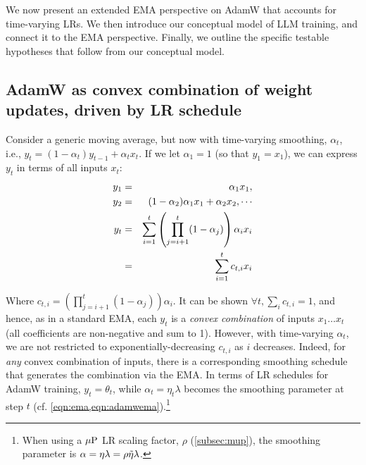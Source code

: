 We now present an extended EMA perspective on AdamW that accounts for
time-varying LRs.  We then introduce our conceptual model of LLM
training, and connect it to the EMA perspective.  Finally, we outline
the specific testable hypotheses that follow from our conceptual
model.

\subsection{AdamW as convex combination of weight updates, driven by LR schedule}\label{subsec:convex}

Consider a generic moving average, but now with time-varying
smoothing, $\alpha_t$, i.e., $y_t = (1 - \alpha_t)y_{t-1} + \alpha_t
x_t$.  If we let $\alpha_1=1$ (so that $y_1=x_1$), we can express
$y_t$ in terms of all inputs $x_t$:
\begin{eqnarray}\label{eqn:extended_ema}
  y_1 &=& \alpha_1 x_1  \notag, \\
  y_2 &=& (1 - \alpha_2) \alpha_1 x_1 + \alpha_2 x_2, \cdots  \notag \\
  y_t &=& \sum_{i=1}^t \left( \prod_{j=i+1}^{t} (1 - \alpha_j) \right) \alpha_i x_i \notag \\
      &=& \sum_{i=1}^t c_{t,i} x_i
\end{eqnarray}

Where $c_{t,i} = \left( \prod_{j=i+1}^{t} (1 - \alpha_j) \right) \alpha_i$.
%
%
%
It can be shown
%
$\forall t, \sum_i c_{t,i} = 1$, and hence, as in a standard EMA, each
$y_t$ is a \emph{convex combination} of inputs $x_1 \ldots x_t$ (all
coefficients are non-negative and sum to 1).  However, with
time-varying $\alpha_t$, we are not restricted to
exponentially-decreasing $c_{t,i}$ as $i$ decreases.  Indeed, for
\emph{any} convex combination of inputs, there is a corresponding
smoothing schedule that generates the combination via the EMA\@.
%
In terms of LR schedules for AdamW training, $y_t = \theta_t$, while
$\alpha_t = \eta_t\lambda$ becomes the smoothing parameter at step $t$
(cf. \cref{eqn:ema,eqn:adamwema}).\footnote{When using a $\mbox{$\mu$P}$ LR
scaling factor, $\rho$ (\cref{subsec:mup}), the smoothing parameter is
$\alpha = \eta\lambda = \rho\tilde{\eta}\lambda$.}

